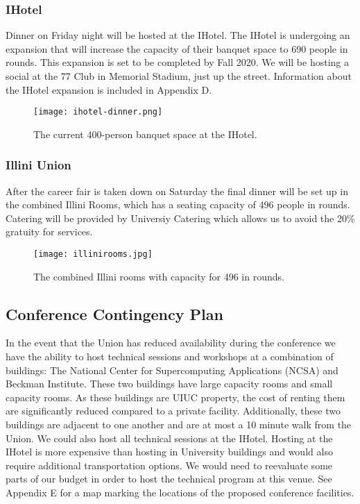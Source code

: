 \subsubsection{IHotel}
Dinner on Friday night will be hosted at the IHotel. The IHotel is undergoing an expansion that will increase the capacity of their banquet space to 690 people in rounds. This expansion is set to be completed by Fall 2020. We will be hosting a social at the 77 Club in Memorial Stadium, just up the street. Information about the IHotel expansion is included in Appendix D.

\begin{figure}[H]
    \centering
    \texttt{[image: ihotel-dinner.png]}
    \caption{The current 400-person banquet space at the IHotel.}
\end{figure}

\subsubsection{Illini Union}
After the career fair is taken down on Saturday the final dinner will be set up in the combined Illini Rooms, which has a seating capacity of 496 people in rounds. Catering will be provided by Universiy Catering which allows us to avoid the 20\% gratuity for services.\\

\begin{figure}[H]
    \centering
    \texttt{[image: illinirooms.jpg]}
    \caption{The combined Illini rooms with capacity for 496 in rounds.}
\end{figure}


\subsection{Conference Contingency Plan}
In the event that the Union has reduced availability during the conference we have the ability to host technical sessions and workshops at a combination of buildings: The National Center for Supercomputing Applications (NCSA) and Beckman Institute. These two buildings have large capacity rooms and small capacity rooms. As these buildings are UIUC property, the cost of renting them are significantly reduced compared to a private facility. Additionally, these two buildings are adjacent to one another and are at most a 10 minute walk from the Union. We could also host all technical sessions at the IHotel. Hosting at the IHotel is more expensive than hosting in University buildings and would also require additional transportation options. We would need to reevaluate some parts of our budget in order to host the technical program at this venue. See Appendix E for a map marking the locations of the proposed conference facilities.\\


